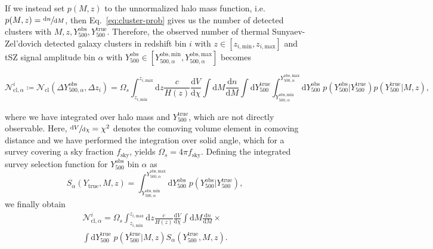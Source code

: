 \documentclass[%
 reprint,
nofootinbib,
 amsmath,amssymb,
 aps,
]{revtex4-1}
\begin{document}
If we instead set $p(M, z)$ to the unnormalized halo mass function, i.e. $p(M, z) = \sfrac{\mathrm{d}n}{\mathrm{d}M}$, then Eq.~\ref{eq:cluster-prob} gives us the number of detected clusters with $M, z, Y_{500}^{\mathrm{obs}}, Y_{500}^{\mathrm{true}}$. Therefore, the observed number of thermal Sunyaev-Zel'dovich detected galaxy clusters in redshift bin $i$ with $z \in [z_{i, \mathrm{min}}, z_{i, \mathrm{max}}]$ and tSZ signal amplitude bin $\alpha$ with $Y_{500}^{\mathrm{obs}} \in [Y_{500, \alpha}^{\mathrm{obs}, \mathrm{min}}, Y_{500, \alpha}^{\mathrm{obs}, \mathrm{max}}]$ becomes
\begin{widetext}
\begin{equation}
\mathcal{N}^{i}_{\mathrm{cl}, \alpha}\coloneqq \mathcal{N}_{\mathrm{cl}}(\Delta Y_{500, \alpha}^{\mathrm{obs}}, \Delta z_{i}) = \Omega_{s} \int_{z_{i, \mathrm{min}}}^{z_{i, \mathrm{max}}} \mathrm{d}z \frac{c}{H(z)} \frac{\mathrm{d}V}{\mathrm{d}\chi} \int \mathrm{d}M \frac{\mathrm{d}n}{\mathrm{d}M} 
\int \mathrm{d}Y_{500}^{\mathrm{true}} \int_{Y_{500, \alpha}^{\mathrm{obs}, \mathrm{min}}}^{Y_{500, \alpha}^{\mathrm{obs}, \mathrm{max}}} \mathrm{d}Y_{500}^{\mathrm{obs}} \; p(Y_{500}^{\mathrm{obs}}|Y_{500}^{\mathrm{true}}) p(Y_{500}^{\mathrm{true}}|M, z),
\end{equation} 
\end{widetext}
where we have integrated over halo mass and $Y_{500}^{\mathrm{true}}$, which are not directly observable.
Here, $\sfrac{\mathrm{d}V}{\mathrm{d}\chi} = \chi^{2}$ denotes the comoving volume element in comoving distance and we have performed the integration over solid angle, which for a survey covering a sky fraction $f_{\mathrm{sky}}$, yields $\Omega_{s} = 4\pi f_{\mathrm{sky}}$.
Defining the integrated survey selection function for $Y_{500}^{\mathrm{obs}}$ bin $\alpha$ as
\begin{equation}
S_{\alpha}(Y_{\mathrm{true}}, M, z) =  \int_{Y_{500, \alpha}^{\mathrm{obs}, \mathrm{min}}}^{Y_{500, \alpha}^{\mathrm{obs}, \mathrm{max}}} \mathrm{d}Y_{500}^{\mathrm{obs}} \; p(Y_{500}^{\mathrm{obs}}|Y_{500}^{\mathrm{true}}),
\end{equation}
we finally obtain
\begin{equation}
\begin{aligned}
\mathcal{N}^{i}_{\mathrm{cl}, \alpha} = \Omega_{s} \int_{z_{i, \mathrm{min}}}^{z_{i, \mathrm{max}}} \mathrm{d}z \frac{c}{H(z)} \frac{\mathrm{d}V}{\mathrm{d}\chi} \int \mathrm{d}M \frac{\mathrm{d}n}{\mathrm{d}M} \times \\ \int \mathrm{d}Y_{500}^{\mathrm{true}}\; p(Y_{500}^{\mathrm{true}}|M, z) S_{\alpha}(Y_{500}^{\mathrm{true}}, M, z).
\label{eq:cluster-counts}
\end{aligned}
\end{equation}
\end{document}
